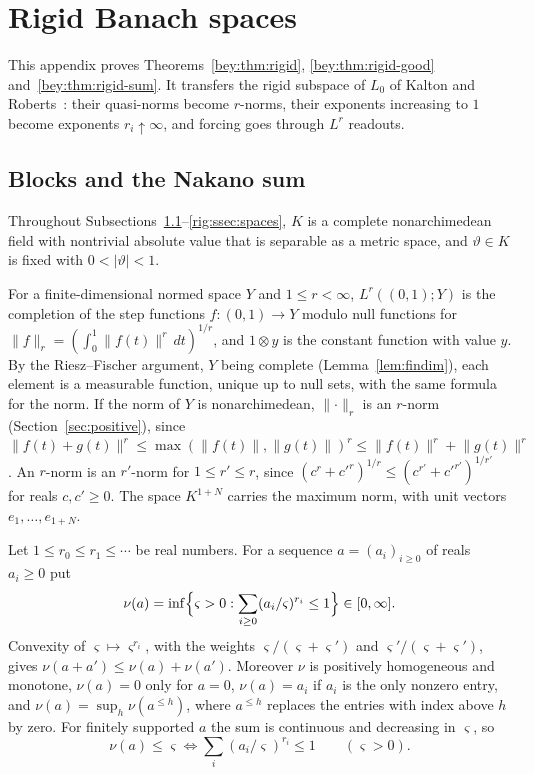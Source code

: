 \documentclass[11pt]{amsart}
\theoremstyle{definition}
\theoremstyle{remark}
\numberwithin{equation}{section}
\newcommand{\abs}[1]{\lvert #1\rvert}
\newcommand{\norm}[1]{\lVert #1\rVert}
\theoremstyle{plain}
\theoremstyle{definition}
\theoremstyle{plain}
\begin{document}
\section{Rigid Banach spaces}\label{app:rigid}

This appendix proves Theorems~\ref{bey:thm:rigid}, \ref{bey:thm:rigid-good} and~\ref{bey:thm:rigid-sum}. It transfers
the rigid subspace of $L_0$ of Kalton and Roberts~\cite[\S3]{KR}: their quasi-norms become $r$\nobreakdash-norms, their
exponents increasing to $1$ become exponents $r_i\uparrow\infty$, and forcing goes through $L^r$ readouts.

\subsection{Blocks and the Nakano sum}\label{rig:ssec:nakano}

Throughout Subsections~\ref{rig:ssec:nakano}--\ref{rig:ssec:spaces}, $K$ is a complete nonarchimedean field with
nontrivial absolute value that is separable as a metric space, and $\vartheta\in K$ is fixed with $0<\abs\vartheta<1$.

For a finite-dimensional normed space $Y$ and $1\le r<\infty$, $L^r((0,1);Y)$ is the completion of the step functions
$f\colon(0,1)\to Y$ modulo null functions for $\norm f_r=(\int_0^1\norm{f(t)}^r\,dt)^{1/r}$, and $1\otimes y$ is the
constant function with value $y$. By the Riesz--Fischer argument, $Y$ being complete (Lemma~\ref{lem:findim}), each
element is a measurable function, unique up to null sets, with the same formula for the norm. If the norm of $Y$ is
nonarchimedean, $\norm\cdot_r$ is an $r$\nobreakdash-norm (Section~\ref{sec:positive}), since
$\norm{f(t)+g(t)}^r\le\max(\norm{f(t)},\norm{g(t)})^r\le\norm{f(t)}^r+\norm{g(t)}^r$. An $r$\nobreakdash-norm is an
$r'$\nobreakdash-norm for $1\le r'\le r$, since $(c^r+c'^r)^{1/r}\le(c^{r'}+c'^{r'})^{1/r'}$ for reals $c,c'\ge0$. The
space $K^{1+N}$ carries the maximum norm, with unit vectors $e_1,\dots,e_{1+N}$.

Let $1\le r_0\le r_1\le\cdots$ be real numbers. For a sequence $a=(a_i)_{i\ge0}$ of reals $a_i\ge0$ put
\[
 \nu(a)=\inf\Bigl\{\varsigma>0:\sum_{i\ge0}(a_i/\varsigma)^{r_i}\le1\Bigr\}\in[0,\infty].
\]
Convexity of $\varsigma\mapsto\varsigma^{r_i}$, with the weights $\varsigma/(\varsigma+\varsigma')$ and
$\varsigma'/(\varsigma+\varsigma')$, gives $\nu(a+a')\le\nu(a)+\nu(a')$. Moreover $\nu$ is positively homogeneous and monotone, $\nu(a)=0$ only for $a=0$,
$\nu(a)=a_i$ if $a_i$ is the only nonzero entry, and $\nu(a)=\sup_h\nu(a^{\le h})$, where $a^{\le h}$ replaces the
entries with index above $h$ by zero. For finitely supported $a$ the sum is continuous and decreasing in $\varsigma$, so
\begin{equation}\label{rig:eq:modular}
 \nu(a)\le\varsigma\iff\textstyle\sum_i(a_i/\varsigma)^{r_i}\le1\qquad(\varsigma>0).
\end{equation}
\end{document}
